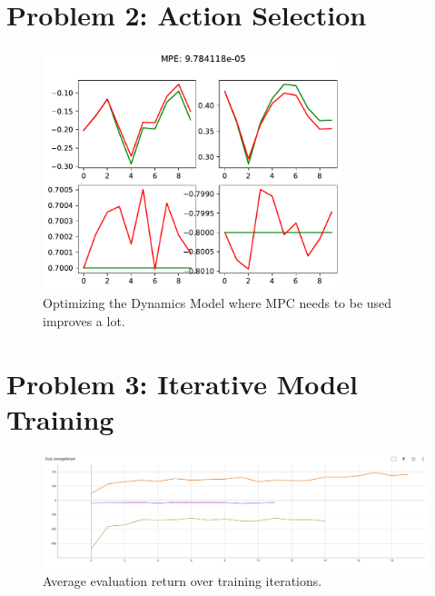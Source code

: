 \documentclass{article}
\begin{document}
\section{Problem 2: Action Selection}
\begin{answer}[title=Plot,height=9.5cm,width=\linewidth]
    \begin{figure}[H]
        \centering
        \includegraphics[height=7cm]{figs/P2.pdf}
        \caption{Optimizing the Dynamics Model where MPC needs to be used improves a lot.}
    \end{figure}
\end{answer}



\section{Problem 3: Iterative Model Training}
\begin{answer}[title=Plot,height=9.5cm,width=\linewidth]
    \begin{figure}[H]
        \centering
        \includegraphics[width=.99\linewidth]{figs/P3_1.png}
        \caption{Average evaluation return over training iterations. \\
            \color{orange}{Orange: cheetah.}
            \color{violet}{Purple: obstacles.}
            \color{green}{Green: reacher.}}
    \end{figure}
\end{answer}
\end{document}
